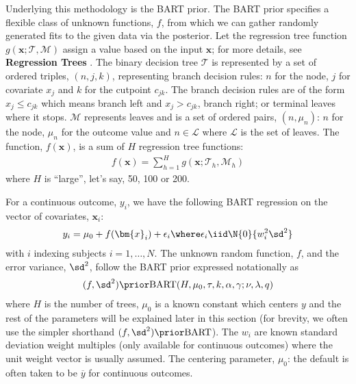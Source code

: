 \documentclass[cmbright,doublespace]{WileySTAT-V1}
\theoremstyle{plain}
\begin{document}
Underlying this methodology is the BART prior.  The BART prior
specifies a flexible class of unknown functions, $f$, from which we
can gather randomly generated fits to the given data via the
posterior.  Let the regression tree function
$g(\bm{x}; \mathcal{T}, \mathcal{M})$ assign a value based on the
input $\bm{x}$; for more details, see \textbf{Regression Trees}
\citep{LeBl14}.  The binary decision tree $\mathcal{T}$ is represented
by a set of ordered triples, $(n, j, k)$, representing branch decision
rules: $n$ for the node, $j$ for covariate $x_j$ and $k$ for the
cutpoint $c_{jk}$.  The branch decision rules are of the form
$x_j\le c_{jk}$ which means branch left and $x_j>c_{jk}$, branch
right; or terminal leaves where it stops.  $\mathcal{M}$ represents
leaves and is a set of ordered pairs, $(n, \mu_n)$: $n$ for the node,
$\mu_n$ for the outcome value and $n \in \mathcal{L}$ where
$\mathcal{L}$ is the set of leaves.
The function, $f(\bm{x})$, is a sum of $H$ regression tree functions:
\begin{align*}
f(\bm{x})=\sum_{h=1}^H g(\bm{x}; \mathcal{T}_h, \mathcal{M}_h)
\end{align*} 
where $H$ is ``large'', let's say, 50, 100 or 200.

For a continuous outcome, $y_i$, we have the following BART regression
on the vector of covariates, $\bm{x}_i$:
\begin{align*}
y_i=\mu_0+f(\bm{x}_i)+\epsilon_i \where \epsilon_i \iid \N{0}{ w_i^2 \sd^2}
\end{align*}
with $i$ indexing subjects $i=1, \dots, N$.  The unknown random
function, $f$, and the error variance, $\sd^2$, follow the BART prior
expressed notationally as
\begin{align*}
(f,\sd^2)\prior\mathrm{BART}(H, \mu_{0}, \tau, k, \alpha, \gamma;
\nu, \lambda, q)
\end{align*}
where $H$ is the number of trees, $\mu_0$ is a known constant which
centers ${y}$ and the rest of the parameters will be explained later
in this section (for brevity, we often use the simpler shorthand
$(f,\sd^2)\prior\mathrm{BART}$).  The $w_i$ are known standard
deviation weight multiples (only available for continuous outcomes)
where the unit weight vector is usually assumed.  The centering
parameter, $\mu_0$: the default is often taken to be $\overline{y}$
for continuous outcomes.
\end{document}
